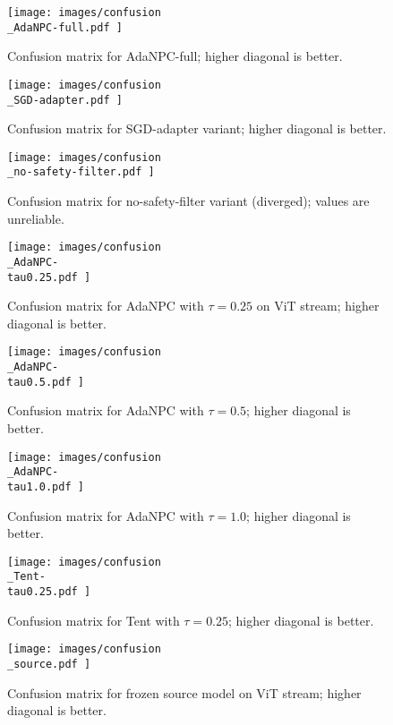 \documentclass{article} %
\begin{document}
\begin{figure}[H]
  \centering
  \texttt{[image:  images/confusion\\\_AdaNPC-full.pdf ]}
  \caption{Confusion matrix for AdaNPC-full; higher diagonal is better.}
\end{figure}
\begin{figure}[H]
  \centering
  \texttt{[image:  images/confusion\\\_SGD-adapter.pdf ]}
  \caption{Confusion matrix for SGD-adapter variant; higher diagonal is better.}
\end{figure}
\begin{figure}[H]
  \centering
  \texttt{[image:  images/confusion\\\_no-safety-filter.pdf ]}
  \caption{Confusion matrix for no-safety-filter variant (diverged); values are unreliable.}
\end{figure}
\begin{figure}[H]
  \centering
  \texttt{[image:  images/confusion\\\_AdaNPC-\\tau0.25.pdf ]}
  \caption{Confusion matrix for AdaNPC with \(\tau = 0.25\) on ViT stream; higher diagonal is better.}
\end{figure}
\begin{figure}[H]
  \centering
  \texttt{[image:  images/confusion\\\_AdaNPC-\\tau0.5.pdf ]}
  \caption{Confusion matrix for AdaNPC with \(\tau = 0.5\); higher diagonal is better.}
\end{figure}
\begin{figure}[H]
  \centering
  \texttt{[image:  images/confusion\\\_AdaNPC-\\tau1.0.pdf ]}
  \caption{Confusion matrix for AdaNPC with \(\tau = 1.0\); higher diagonal is better.}
\end{figure}
\begin{figure}[H]
  \centering
  \texttt{[image:  images/confusion\\\_Tent-\\tau0.25.pdf ]}
  \caption{Confusion matrix for Tent with \(\tau = 0.25\); higher diagonal is better.}
\end{figure}
\begin{figure}[H]
  \centering
  \texttt{[image:  images/confusion\\\_source.pdf ]}
  \caption{Confusion matrix for frozen source model on ViT stream; higher diagonal is better.}
\end{figure}
\end{document}
